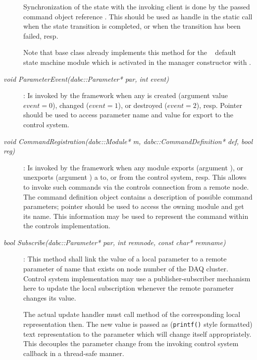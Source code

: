 \begin{description}
Synchronization of the state with the invoking client is done by
the passed command object reference . 
This should be used as handle in the static call  when the state transition is completed, or  when the transition has been failed, resp.

Note that base class  already implements this method for the 
\dabc~ default state machine module which is activated in the
manager constructor with . 



\item[\em void ParameterEvent(dabc::Parameter* par, int event)] :
Is invoked by the framework when any  is created 
(argument value $event=0$),  changed ($event=1$),
or destroyed ($event=2$), resp. Pointer  should be used to access parameter
name and value for export to the control system. 


\item[\em void CommandRegistration(dabc::Module* m, dabc::CommandDefinition* def, bool reg)] :
Is invoked by the framework when any module exports (argument  ), or
unexports (argument  ) a 
to, or from the control system, resp. This allows to invoke such 
commands via the controls connection from a remote node. 
The command definition object 
contains a description of possible command parameters; 
pointer  should be used to access the owning module and
get its name. This information may be used to represent the command within
the controls implementation.




\item[\em bool Subscribe(dabc::Parameter* par, int remnode, 
const char* remname)] :
This method shall link the value of a local parameter  to a remote parameter
of name  that exists on node number  of the DAQ
cluster. Control system implementation may use a publisher-subscriber mechanism here
to update the local subscription whenever the remote parameter changes its value.

The actual update handler must call method 
of the corresponding local representation  then.
The new value  is passed as ({\tt printf()} style formatted) 
text representation to the parameter which 
will change itself appropriately. This decouples the parameter change
from the invoking control system callback in a thread-safe manner.


\end{description}

